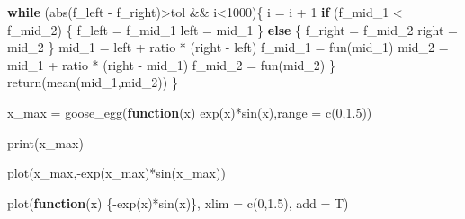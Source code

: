 \documentclass[
]{article}
\newenvironment{Shaded}{\begin{snugshade}}{\end{snugshade}}
\newcommand{\AttributeTok}[1]{\textcolor[rgb]{0.77,0.63,0.00}{#1}}
\newcommand{\ControlFlowTok}[1]{\textcolor[rgb]{0.13,0.29,0.53}{\textbf{#1}}}
\newcommand{\DecValTok}[1]{\textcolor[rgb]{0.00,0.00,0.81}{#1}}
\newcommand{\FloatTok}[1]{\textcolor[rgb]{0.00,0.00,0.81}{#1}}
\newcommand{\FunctionTok}[1]{\textcolor[rgb]{0.00,0.00,0.00}{#1}}
\newcommand{\NormalTok}[1]{#1}
\newcommand{\OtherTok}[1]{\textcolor[rgb]{0.56,0.35,0.01}{#1}}
\newcommand{\SpecialCharTok}[1]{\textcolor[rgb]{0.00,0.00,0.00}{#1}}
\begin{document}
\begin{Shaded}
\begin{Highlighting}[]
    \ControlFlowTok{while}\NormalTok{ (}\FunctionTok{abs}\NormalTok{(f\_left }\SpecialCharTok{{-}}\NormalTok{ f\_right)}\SpecialCharTok{\textgreater{}}\NormalTok{tol }\SpecialCharTok{\&\&}\NormalTok{ i}\SpecialCharTok{\textless{}}\DecValTok{1000}\NormalTok{)\{}
\NormalTok{      i }\OtherTok{=}\NormalTok{ i }\SpecialCharTok{+} \DecValTok{1}
      \ControlFlowTok{if}\NormalTok{ (f\_mid\_1 }\SpecialCharTok{\textless{}}\NormalTok{ f\_mid\_2) \{}
\NormalTok{        f\_left }\OtherTok{=}\NormalTok{ f\_mid\_1}
\NormalTok{        left }\OtherTok{=}\NormalTok{ mid\_1}
\NormalTok{      \} }\ControlFlowTok{else}\NormalTok{ \{}
\NormalTok{        f\_right }\OtherTok{=}\NormalTok{ f\_mid\_2}
\NormalTok{        right }\OtherTok{=}\NormalTok{ mid\_2}
\NormalTok{      \}}
\NormalTok{      mid\_1 }\OtherTok{=}\NormalTok{ left }\SpecialCharTok{+}\NormalTok{ ratio }\SpecialCharTok{*}\NormalTok{ (right }\SpecialCharTok{{-}}\NormalTok{ left)}
\NormalTok{      f\_mid\_1 }\OtherTok{=} \FunctionTok{fun}\NormalTok{(mid\_1)}
\NormalTok{      mid\_2 }\OtherTok{=}\NormalTok{ mid\_1 }\SpecialCharTok{+}\NormalTok{ ratio }\SpecialCharTok{*}\NormalTok{ (right }\SpecialCharTok{{-}}\NormalTok{ mid\_1)}
\NormalTok{      f\_mid\_2 }\OtherTok{=} \FunctionTok{fun}\NormalTok{(mid\_2)}
\NormalTok{    \}}
    \FunctionTok{return}\NormalTok{(}\FunctionTok{mean}\NormalTok{(mid\_1,mid\_2))}
\NormalTok{  \}}
\end{Highlighting}
\end{Shaded}

\begin{Shaded}
\begin{Highlighting}[]
\NormalTok{x\_max }\OtherTok{=} \FunctionTok{goose\_egg}\NormalTok{(}\ControlFlowTok{function}\NormalTok{(x) }\FunctionTok{exp}\NormalTok{(x)}\SpecialCharTok{*}\FunctionTok{sin}\NormalTok{(x),}\AttributeTok{range =} \FunctionTok{c}\NormalTok{(}\DecValTok{0}\NormalTok{,}\FloatTok{1.5}\NormalTok{))}

\FunctionTok{print}\NormalTok{(x\_max)}

\FunctionTok{plot}\NormalTok{(x\_max,}\SpecialCharTok{{-}}\FunctionTok{exp}\NormalTok{(x\_max)}\SpecialCharTok{*}\FunctionTok{sin}\NormalTok{(x\_max))}

\FunctionTok{plot}\NormalTok{(}\ControlFlowTok{function}\NormalTok{(x) \{}\SpecialCharTok{{-}}\FunctionTok{exp}\NormalTok{(x)}\SpecialCharTok{*}\FunctionTok{sin}\NormalTok{(x)\}, }\AttributeTok{xlim =} \FunctionTok{c}\NormalTok{(}\DecValTok{0}\NormalTok{,}\FloatTok{1.5}\NormalTok{), }\AttributeTok{add =}\NormalTok{ T)}
\end{Highlighting}
\end{Shaded}
\end{document}
